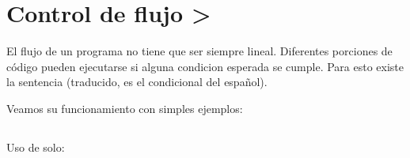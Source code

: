 \documentclass[a4paper,12pt,spanish]{sphinxmanual}
\begin{document}
\begin{sphinxVerbatim}[commandchars=\\\{\}]
  
  

  

  

  
\end{sphinxVerbatim}


\section{Control de flujo \sphinxhyphen{}\textgreater{} }
\label{\detokenize{bool:control-de-flujo-if-elif-else}}
\sphinxAtStartPar
El flujo de un programa no tiene que ser siempre lineal.
Diferentes porciones de código pueden ejecutarse si alguna condicion esperada se cumple.
Para esto existe la sentencia  (traducido, es el  condicional del español).

\sphinxAtStartPar
Veamos su funcionamiento con simples ejemplos:


\subsection{}
\label{\detokenize{bool:if}}
\sphinxAtStartPar
Uso de  solo:

\begin{sphinxVerbatim}[commandchars=\\\{\}]
  
     
\end{sphinxVerbatim}
\end{document}
